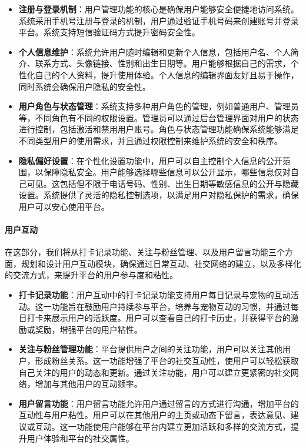 \begin{itemize}
	\item \textbf{注册与登录机制}：用户管理功能的核心是确保用户能够安全便捷地访问系统。系统采用手机号注册与登录的机制，用户通过验证手机号码来创建账号并登录平台。系统支持短信验证码方式提升密码安全性。
	\item \textbf{个人信息维护}：系统允许用户随时编辑和更新个人信息，包括用户名、个人简介、联系方式、头像链接、性别和出生日期等。用户能够根据自己的需求，个性化自己的个人资料，提升使用体验。个人信息的编辑界面友好且易于操作，同时系统会确保用户隐私的安全性。
	\item \textbf{用户角色与状态管理}：系统支持多种用户角色的管理，例如普通用户、管理员等，不同角色有不同的权限设置。管理员可以通过后台管理界面对用户的状态进行控制，包括激活和禁用用户账号。角色与状态管理功能确保系统能够满足不同类型用户的使用需求，并且通过权限控制来维护系统的安全和秩序。
	\item \textbf{隐私偏好设置}：在个性化设置功能中，用户可以自主控制个人信息的公开范围，以保障隐私安全。用户能够选择哪些信息可以公开显示，哪些信息仅对自己可见。这包括但不限于电话号码、性别、出生日期等敏感信息的公开与隐藏设置。系统提供了灵活的隐私控制选项，以满足用户对隐私保护的需求，确保用户可以安心使用平台。
\end{itemize}

\paragraph{用户互动}

在这部分，我们将从打卡记录功能、关注与粉丝管理、以及用户留言功能三个方面，规划和设计用户互动模块，确保通过日常互动、社交网络的建立，以及多样化的交流方式，来提升平台的用户参与度和粘性。

\begin{itemize}
	\item \textbf{打卡记录功能}：用户互动中的打卡记录功能支持用户每日记录与宠物的互动活动。这一功能旨在鼓励用户持续参与平台，培养与宠物互动的习惯，并通过每日打卡来展示用户的活跃度。用户可以查看自己的打卡历史，并获得平台的激励或奖励，增强平台的用户粘性。
	\item \textbf{关注与粉丝管理功能}：平台提供用户之间的关注功能，用户可以关注其他用户，形成粉丝关系。这一功能增强了平台的社交互动性，使用户可以轻松获取自己关注的用户的动态和更新。通过关注功能，用户可以建立更紧密的社交网络，增加与其他用户的互动频率。
	\item \textbf{用户留言功能}：用户留言功能允许用户通过留言的方式进行沟通，增加平台的互动性与用户粘性。用户可以在其他用户的主页或动态下留言，表达意见、建议或互动。这一功能使用户能够在平台内建立更加活跃和多样的交流方式，提升用户体验和平台的社交属性。
\end{itemize}

